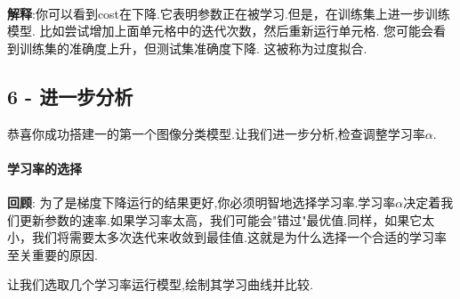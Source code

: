 \documentclass[11pt]{article}
\begin{document}
    \begin{center}
    \end{center}
    { \hspace*{\fill} \\}
    
    \textbf{解释}:你可以看到cost在下降.它表明参数正在被学习.但是，在训练集上进一步训练模型.
比如尝试增加上面单元格中的迭代次数，然后重新运行单元格.
您可能会看到训练集的准确度上升，但测试集准确度下降. 这被称为过度拟合.

    \subsection{6 - 进一步分析}\label{ux8fdbux4e00ux6b65ux5206ux6790}

恭喜你成功搭建一的第一个图像分类模型.让我们进一步分析,检查调整学习率\(\alpha\).

    \paragraph{学习率的选择}\label{ux5b66ux4e60ux7387ux7684ux9009ux62e9}

\textbf{回顾}:
为了是梯度下降运行的结果更好,你必须明智地选择学习率.学习率\(\alpha\)决定着我们更新参数的速率.如果学习率太高，我们可能会"错过"最优值.同样，如果它太小，我们将需要太多次迭代来收敛到最佳值.这就是为什么选择一个合适的学习率至关重要的原因.

让我们选取几个学习率运行模型,绘制其学习曲线并比较.
\end{document}
